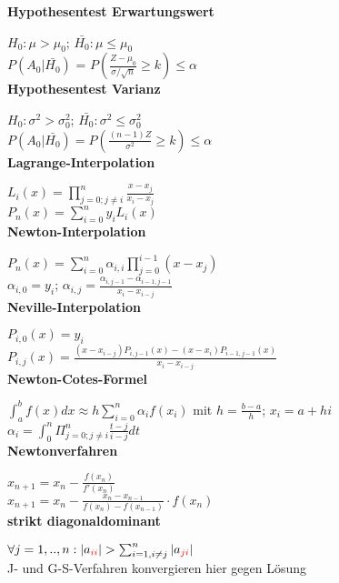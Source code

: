 \documentclass[10pt,twocolumn,a4paper]{article}
\begin{document}
\begin{flushleft}
\textbf{Hypothesentest Erwartungswert}

$H_0: \mu > \mu_0$; $\bar{H_0}: \mu \leq \mu_0$\\
$P(A_0|\bar{H_0})$ = $P(\frac{Z-\mu_0}{\sigma/\sqrt{n}} \geq k) \leq \alpha$\\

\textbf{Hypothesentest Varianz}

$H_0: \sigma^2 > \sigma_0^2$; $\bar{H_0}: \sigma^2 \leq \sigma_0^2$\\
$P(A_0|\bar{H_0}) = P(\frac{(n-1)Z}{\sigma^2} \geq k) \leq \alpha$\\

\textbf{Lagrange-Interpolation}

$L_i(x) = \prod_{j=0;j \ne i}^n \frac{x-x_j}{x_i-x_j}$\\
$P_n(x) = \sum_{i=0}^n y_i L_i(x)$\\

\textbf{Newton-Interpolation}

$P_n(x) = \sum_{i=0}^n \alpha_{i,i} \prod_{j=0}^{i-1}(x-x_j)$\\
$\alpha_{i,0} = y_i$; $\alpha_{i,j} = \frac{\alpha_{i,j-1} - \alpha_{i-1,j-1}}{x_i - x_{i-j}}$\\

\textbf{Neville-Interpolation}

$P_{i,0}(x) = y_i$\\
$P_{i,j}(x) = \frac{(x-x_{i-j})P_{i,j-1}(x) - (x-x_i)P_{i-1,j-1}(x)}{x_i - x_{i-j}}$\\

\textbf{Newton-Cotes-Formel}

$\int_a^b f(x) dx \approx h \sum_{i=0}^n \alpha_i f(x_i)$ mit $h=\frac{b-a}{h}$; $x_i = a + hi$\\
$\alpha_i = \int_0^n \Pi_{j=0;j\neq i}^n \frac{t-j}{i-j} dt$\\

\textbf{Newtonverfahren}

$x_{n+1} = x_n - \frac{f(x_n)}{f'(x_n)}$\\
$x_{n+1} = x_n - \frac{x_n - x_{n-1}}{f(x_n) - f(x_{n-1})} \cdot f(x_n)$\\

\textbf{strikt diagonaldominant}

$\forall j = 1,..,n: |a_{\textcolor{red}{ii}}| > \sum_{i=1,i\neq j}^n |a_{\textcolor{red}{ji}}|$\\
J- und G-S-Verfahren konvergieren hier gegen Lösung\\


\end{flushleft}
\end{document}
